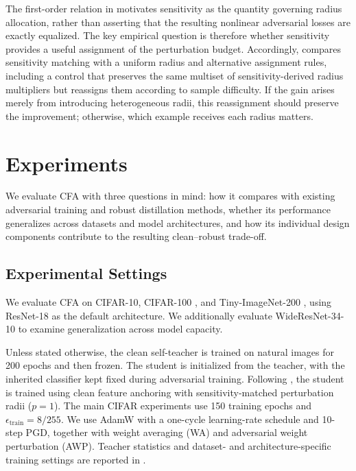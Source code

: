 \documentclass{article} %
\theoremstyle{plain}
\begin{document}
The first-order relation in  motivates sensitivity as
the quantity governing radius allocation, rather than asserting that the
resulting nonlinear adversarial losses are exactly equalized. The key
empirical question is therefore whether sensitivity provides a useful
assignment of the perturbation budget. Accordingly, 
compares sensitivity matching with a uniform radius and alternative
assignment rules, including a control that preserves the same multiset of
sensitivity-derived radius multipliers but reassigns them according to
sample difficulty. If the gain arises merely from introducing heterogeneous
radii, this reassignment should preserve the improvement; otherwise, which
example receives each radius matters.

\section{Experiments}
\label{sec:exp}

We evaluate CFA with three questions in mind: how it compares with existing
adversarial training and robust distillation methods, whether its performance
generalizes across datasets and model architectures, and how its individual
design components contribute to the resulting clean--robust trade-off.


\subsection{Experimental Settings}

We evaluate CFA on CIFAR-10, CIFAR-100
\citep{krizhevsky2009learning}, and Tiny-ImageNet-200
\citep{le2015tiny}, using ResNet-18 as the default architecture.
We additionally evaluate WideResNet-34-10 to examine generalization across
model capacity.

Unless stated otherwise, the clean self-teacher is trained on natural images
for 200 epochs and then frozen. The student is initialized from the teacher,
with the inherited classifier kept fixed during adversarial training.
Following , the student is trained using clean feature
anchoring with sensitivity-matched perturbation radii (\(p=1\)).
The main CIFAR experiments use 150 training epochs and
\(\epsilon_{\mathrm{train}}=8/255\).
We use AdamW with a one-cycle learning-rate schedule and 10-step PGD,
together with weight averaging (WA) and adversarial weight perturbation
(AWP). Teacher statistics and dataset- and architecture-specific training
settings are reported in .
\end{document}
